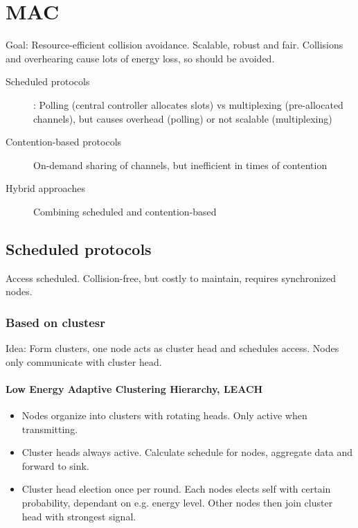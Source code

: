 \section{MAC}

Goal: Resource-efficient collision avoidance. Scalable, robust and fair.
Collisions and overhearing cause lots of energy loss, so should be avoided.

\begin{description}
		\item[Scheduled protocols]: Polling (central controller allocates
				slots) vs multiplexing (pre-allocated channels), but causes
				overhead (polling) or not scalable (multiplexing)
		\item[Contention-based protocols] On-demand sharing of channels, but
				inefficient in times of contention
		\item[Hybrid approaches] Combining scheduled and contention-based
\end{description}

\subsection{Scheduled protocols}

Access scheduled. Collision-free, but costly to maintain, requires synchronized
nodes.

\subsubsection{Based on clustesr}

Idea: Form clusters, one node acts as cluster head and schedules access. Nodes
only communicate with cluster head.

\paragraph{Low Energy Adaptive Clustering Hierarchy, LEACH}

\begin{itemize}
		\item Nodes organize into clusters with rotating heads. Only active
				when transmitting.
		\item Cluster heads always active. Calculate schedule for nodes,
				aggregate data and forward to sink.
		\item Cluster head election once per round. Each nodes elects self with
				certain probability, dependant on e.g. energy level. Other
				nodes then join cluster head with strongest signal.
\end{itemize}


